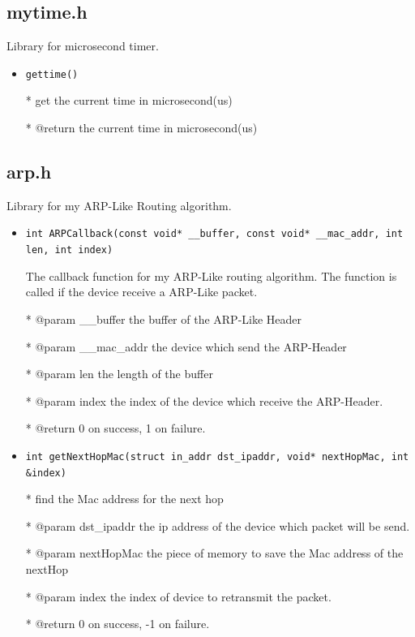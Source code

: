 \documentclass[11pt]{article}
\begin{document}
	\subsection*{mytime.h}
	
	\par Library for microsecond timer.
	
	\begin{itemize}
		\item \texttt{gettime()}
		
		* get the current time in microsecond(us)
		
		* @return the current time in microsecond(us)
		
	\end{itemize}
	
	\subsection*{arp.h}
	
	\par Library for my ARP-Like Routing algorithm.
	
	\begin{itemize}
		\item \texttt{int ARPCallback(const void* \_\_buffer, const void* \_\_mac\_addr, int len, int index)}
	
		The callback function for my ARP-Like routing algorithm. The function is called if the device receive a ARP-Like packet.
		
		* @param \_\_buffer the buffer of the ARP-Like Header
		
		* @param \_\_mac\_addr the device which send the ARP-Header
		
		* @param len the length of the buffer
		
		* @param index the index of the device which receive the ARP-Header.
		
		* @return 0 on success, 1 on failure.
		
		
		\item \texttt{int getNextHopMac(struct in\_addr dst\_ipaddr, void* nextHopMac, int \&index)}
		
		* find the Mac address for the next hop
		 
		* @param dst\_ipaddr the ip address of the device which packet will be send.
		
		* @param nextHopMac the piece of memory to save the Mac address of the nextHop
		
		* @param index      the index of device to retransmit the packet.
		
		* @return 0 on success, -1 on failure.
	\end{itemize}
	
\end{document}
